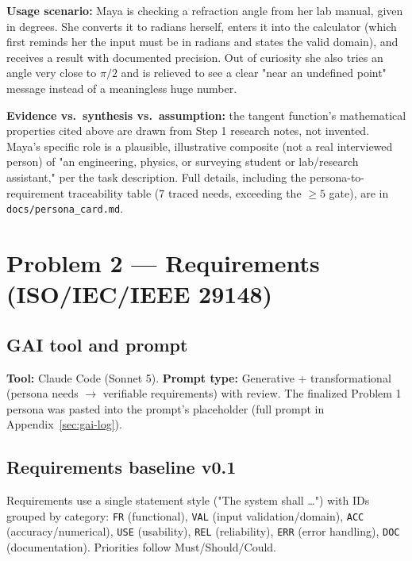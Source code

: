 \documentclass[11pt]{article}
\begin{document}
\textbf{Usage scenario:} Maya is checking a refraction angle from her lab manual, given in degrees. She converts it to radians herself, enters it into the calculator (which first reminds her the input must be in radians and states the valid domain), and receives a result with documented precision. Out of curiosity she also tries an angle very close to $\pi/2$ and is relieved to see a clear "near an undefined point" message instead of a meaningless huge number.

\textbf{Evidence vs.\ synthesis vs.\ assumption:} the tangent function's mathematical properties cited above are drawn from Step 1 research notes, not invented. Maya's specific role is a plausible, illustrative composite (not a real interviewed person) of "an engineering, physics, or surveying student or lab/research assistant," per the task description. Full details, including the persona-to-requirement traceability table (7 traced needs, exceeding the $\ge 5$ gate), are in \texttt{docs/persona\_card.md}.

\section{Problem 2 --- Requirements (ISO/IEC/IEEE 29148)}

\subsection{GAI tool and prompt}
\textbf{Tool:} Claude Code (Sonnet 5). \textbf{Prompt type:} Generative + transformational (persona needs $\rightarrow$ verifiable requirements) with review. The finalized Problem 1 persona was pasted into the prompt's placeholder (full prompt in Appendix~\ref{sec:gai-log}).

\subsection{Requirements baseline v0.1}

Requirements use a single statement style ("The system shall \ldots") with IDs grouped by category: \texttt{FR} (functional), \texttt{VAL} (input validation/domain), \texttt{ACC} (accuracy/numerical), \texttt{USE} (usability), \texttt{REL} (reliability), \texttt{ERR} (error handling), \texttt{DOC} (documentation). Priorities follow Must/Should/Could.
\end{document}
